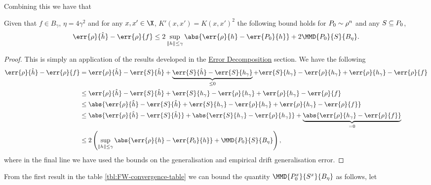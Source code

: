 Combining this we have that
\begin{theorem}
  \label{thm:al-non-generalisation-bound}
  Given that \(f \in B_{\gamma}\), \(\eta = 4\gamma^{2}\) and for any \(x, x' \in
  \X\), \(K'(x, x') = K(x, x')^2\) the following bound holds for \(P_{0} \sim \rho^{n}\) and any \(S \subseteq P_0\),
  \begin{equation}
    \label{eq:al-non-generalisation-bound}
    \err{\rho}{\hat{h}} - \err{\rho}{f} \leq 2\sup_{\|h\| \leq \gamma}\abs{\err{\rho}{h} - \err{\poolset_0}{h}} + 2 \MMD{\poolset_0}{\trainset}{B_\eta}.
  \end{equation}
\end{theorem}

\begin{proof}
  This is simply an application of the results developed in the
  \hyperref[sec:error-decomposition]{Error Decomposition} section. We have the following
  \begin{align*}
    \err{\rho}{\hat{h}} - \err{\rho}{f} & = \err{\rho}{\hat{h}} - \err{\trainset}{\hat{h}} + \underbrace{\err{\trainset}{\hat{h}} - \err{\trainset}{h_{\gamma}}}_{\leq 0} + \err{\trainset}{h_{\gamma}} - \err{\rho}{h_{\gamma}} + \err{\rho}{h_{\gamma}} - \err{\rho}{f} \\ 
                                        & \leq \err{\rho}{\hat{h}} - \err{\trainset}{\hat{h}} + \err{\trainset}{h_{\gamma}} - \err{\rho}{h_{\gamma}} + \err{\rho}{h_{\gamma}} - \err{\rho}{f} \\
                                        & \leq \abs{\err{\rho}{\hat{h}} - \err{\trainset}{\hat{h}} + \err{\trainset}{h_{\gamma}} - \err{\rho}{h_{\gamma}} + \err{\rho}{h_{\gamma}} - \err{\rho}{f}} \\
                                        & \leq \abs{\err{\rho}{\hat{h}} - \err{\trainset}{\hat{h}}} + \abs{\err{\trainset}{h_{\gamma}} - \err{\rho}{h_{\gamma}}} + \underbrace{\abs{\err{\rho}{h_{\gamma}} - \err{\rho}{f}}}_{= 0} \\
                                        & \leq 2 \left( \sup_{\|h\| \leq \gamma}\abs{\err{\rho}{h} - \err{\poolset_0}{h}} + \MMD{\poolset_0}{\trainset}{B_\eta} \right),
  \end{align*}
  where in the final line we have used the bounds on the generalisation and empirical drift generalisation error.
\end{proof}
From the first result in the table \ref{tbl:FW-convergence-table} we can bound the
quantity \(\MMD{\poolsetx_{0}}{\trainsetx}{B_{\eta}}\) as follows, let
